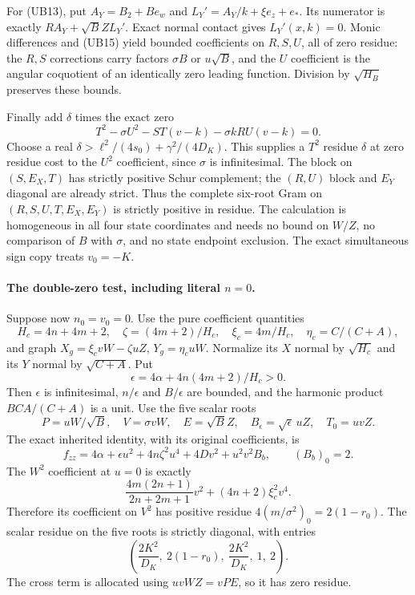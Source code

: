 For (UB13), put $A_Y=B_2+B e_w$ and
$L_Y'=A_Y/k+\xi e_z+e_*$.  Its numerator is exactly
$RA_Y+\sqrt B ZL_Y'$.  Exact normal contact gives
$L_Y'(x,k)=0$.  Monic differences and (UB15) yield bounded
coefficients on $R,S,U$, all of zero residue: the $R,S$ corrections
carry factors $\sigma B$ or $u\sqrt B$, and the $U$ coefficient
is the angular coquotient of an identically zero leading function.
Division by $\sqrt{H_B}$ preserves these bounds.

Finally add $\delta$ times the exact zero
\[
       T^2-\sigma U^2-ST(v-k)-\sigma kRU(v-k)=0.    \tag{UB17}
\]
Choose a real $\delta>\ell^2/(4s_0)+\gamma^2/(4D_K)$.
This supplies a $T^2$ residue $\delta$ at zero residue cost to
the $U^2$ coefficient, since $\sigma$ is infinitesimal.  The block
on $(S,E_X,T)$ has strictly positive Schur complement; the $(R,U)$
block and $E_Y$ diagonal are already strict.  Thus the complete
six-root Gram on $(R,S,U,T,E_X,E_Y)$ is strictly positive in
residue.  The calculation is homogeneous in all four state
coordinates and needs no bound on $W/Z$, no comparison of $B$ with
$\sigma$, and no state endpoint exclusion.  The exact simultaneous
sign copy treats $v_0=-K$.

\paragraph{The double-zero test, including literal $n=0$.}
Suppose now $n_0=v_0=0$.  Use the pure coefficient quantities
\[
 H_c=4n+4m+2,\quad \zeta=(4m+2)/H_c,\quad
 \xi_c=4m/H_c,\quad \eta_c=C/(C+A),
\]
and graph $X_g=\xi_cvW-\zeta uZ$, $Y_g=\eta_cuW$.
Normalize its $X$ normal by $\sqrt{H_c}$ and its $Y$ normal by
$\sqrt{C+A}$.  Put
\[
 \epsilon=4\alpha+4n(4m+2)/H_c>0.
\]
Then $\epsilon$ is infinitesimal, $n/\epsilon$ and $B/\epsilon$
are bounded, and the harmonic product $BCA/(C+A)$ is a unit.
Use the five scalar roots
\[
 P=uW/\sqrt B,\quad V=\sigma vW,\quad E=\sqrt B Z,
 \quad B_\epsilon=\sqrt\epsilon\,uZ,\quad T_0=uvZ.
\]
The exact inherited identity, with its original coefficients,
is
\[
 f_{zz}=4\alpha+\epsilon u^2+4n\zeta^2u^4
                       +4Dv^2+u^2v^2 B_b,
 \qquad (B_b)_0=2.
\]
The $W^2$ coefficient at $u=0$ is exactly
\[
 \frac{4m(2n+1)}{2n+2m+1}v^2
              +(4n+2)\xi_c^2v^4.
\]
Therefore its coefficient on $V^2$ has positive residue
$4(m/\sigma^2)_0=2(1-r_0)$.  The scalar residue on the five roots
is strictly diagonal, with entries
\[
 \left(\frac{2K^2}{D_K},\ 2(1-r_0),\
        \frac{2K^2}{D_K},\ 1,\ 2\right).
\]
The cross term is allocated using $uvWZ=vPE$, so it has zero residue.

